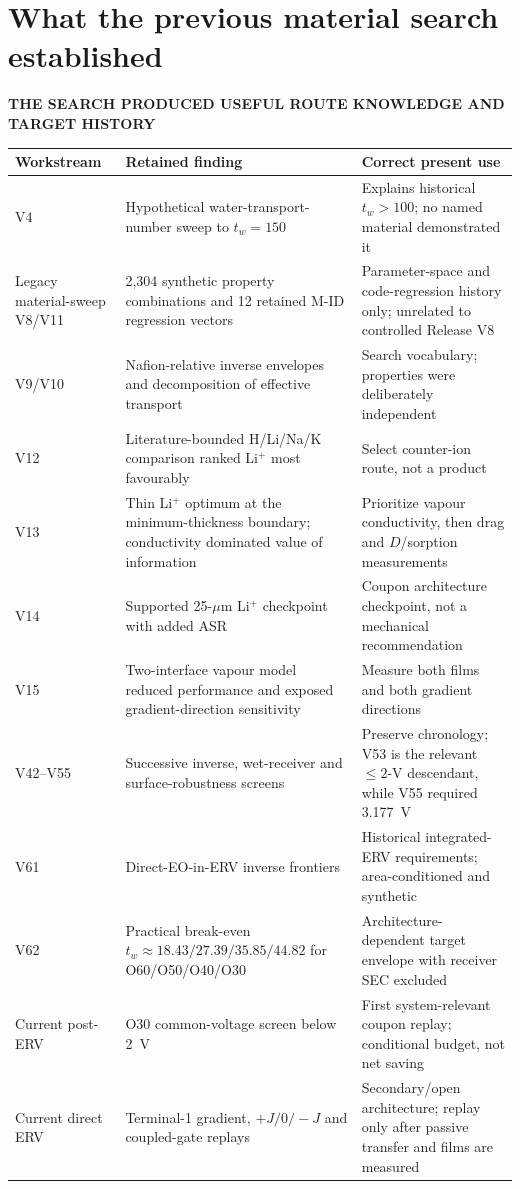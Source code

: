 \documentclass[10pt,a4paper]{article}
\newcommand{\eyebrow}[1]{{\sffamily\bfseries\small\color{Teal}\MakeUppercase{#1}}}
\begin{document}
\section{What the previous material search established}
\eyebrow{The search produced useful route knowledge and target history}

\begin{center}\small
\begin{tabularx}{\textwidth}{@{}p{24mm}p{45mm}Y@{}}
\toprule
\textbf{Workstream} & \textbf{Retained finding} & \textbf{Correct present use} \\
\midrule
V4 & Hypothetical water-transport-number sweep to $t_w=150$ & Explains historical $t_w>100$; no named material demonstrated it \\
Legacy material-sweep V8/V11 & 2,304 synthetic property combinations and 12 retained M-ID regression vectors & Parameter-space and code-regression history only; unrelated to controlled Release V8 \\
V9/V10 & Nafion-relative inverse envelopes and decomposition of effective transport & Search vocabulary; properties were deliberately independent \\
V12 & Literature-bounded H/Li/Na/K comparison ranked Li$^+$ most favourably & Select counter-ion route, not a product \\
V13 & Thin Li$^+$ optimum at the minimum-thickness boundary; conductivity dominated value of information & Prioritize vapour conductivity, then drag and $D$/sorption measurements \\
V14 & Supported 25-$\mu$m Li$^+$ checkpoint with added ASR & Coupon architecture checkpoint, not a mechanical recommendation \\
V15 & Two-interface vapour model reduced performance and exposed gradient-direction sensitivity & Measure both films and both gradient directions \\
V42--V55 & Successive inverse, wet-receiver and surface-robustness screens & Preserve chronology; V53 is the relevant $\leq2$-V descendant, while V55 required 3.177~V \\
V61 & Direct-EO-in-ERV inverse frontiers & Historical integrated-ERV requirements; area-conditioned and synthetic \\
V62 & Practical break-even $t_w\approx18.43/27.39/35.85/44.82$ for O60/O50/O40/O30 & Architecture-dependent target envelope with receiver SEC excluded \\
Current post-ERV & O30 common-voltage screen below 2~V & First system-relevant coupon replay; conditional budget, not net saving \\
Current direct ERV & Terminal-1 gradient, $+J/0/-J$ and coupled-gate replays & Secondary/open architecture; replay only after passive transfer and films are measured \\
\bottomrule
\end{tabularx}
\end{center}
\end{document}
